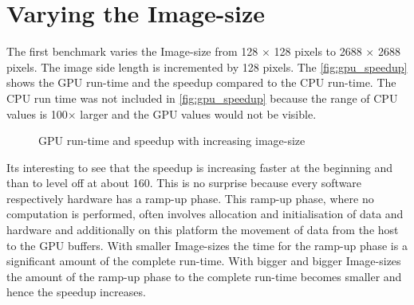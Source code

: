 \section{Varying the Image-size} %
\label{sec:varying_the_image_size}
The first benchmark varies the Image-size from 128 $\times$ 128 pixels to 2688
$\times$ 2688 pixels. The image side length is incremented by 128 pixels. The
\autoref{fig:gpu_speedup} shows the \gls{GPU} run-time and the speedup compared
to the \gls{CPU} run-time. The \gls{CPU} run time was not included in
\autoref{fig:gpu_speedup} because the range of \gls{CPU} values is 100$\times$ 
larger and the \gls{GPU} values would not be visible. 
\begin{figure}[ht]
	\centering
		\caption{\protect\gls{GPU} run-time and speedup with increasing image-size}%
		\label{fig:gpu_speedup}%
	\end{figure}
Its interesting to see that the speedup is increasing faster at the beginning
and than to level off at about 160. This is no surprise because every software
respectively hardware has a ramp-up phase. This ramp-up phase, where no
computation is performed, often involves allocation and initialisation of data
and hardware and additionally on this platform the movement of data from the
host to the \gls{GPU} buffers. With smaller Image-sizes the time for the ramp-up
phase is a significant amount of the complete run-time. With bigger and bigger
Image-sizes the amount of the ramp-up phase to the complete run-time becomes 
smaller and hence the speedup increases. 

